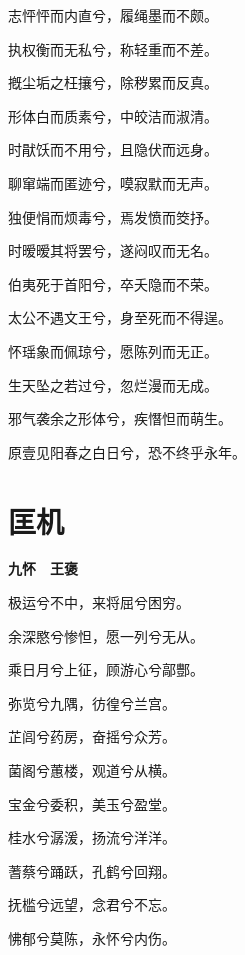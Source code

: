 \documentclass[12pt,a4paper]{ctexbook}
\begin{document}
志怦怦而内直兮，履绳墨而不颇。\par
执权衡而无私兮，称轻重而不差。\par
摡尘垢之枉攘兮，除秽累而反真。\par
形体白而质素兮，中皎洁而淑清。\par
时猒饫而不用兮，且隐伏而远身。\par
聊窜端而匿迹兮，嗼寂默而无声。\par
独便悁而烦毒兮，焉发愤而筊抒。\par
时暧暧其将罢兮，遂闷叹而无名。\par
伯夷死于首阳兮，卒夭隐而不荣。\par
太公不遇文王兮，身至死而不得逞。\par
怀瑶象而佩琼兮，愿陈列而无正。\par
生天坠之若过兮，忽烂漫而无成。\par
邪气袭余之形体兮，疾憯怛而萌生。\par
原壹见阳春之白日兮，恐不终乎永年。\par

\section{匡机}
\textbf{九怀　王褒}\par\vspace{0.5em}
极运兮不中，来将屈兮困穷。\par
余深愍兮惨怛，愿一列兮无从。\par
乘日月兮上征，顾游心兮鄗酆。\par
弥览兮九隅，彷徨兮兰宫。\par
芷闾兮药房，奋摇兮众芳。\par
菌阁兮蕙楼，观道兮从横。\par
宝金兮委积，美玉兮盈堂。\par
桂水兮潺湲，扬流兮洋洋。\par
蓍蔡兮踊跃，孔鹤兮回翔。\par
抚槛兮远望，念君兮不忘。\par
怫郁兮莫陈，永怀兮内伤。\par
\end{document}
